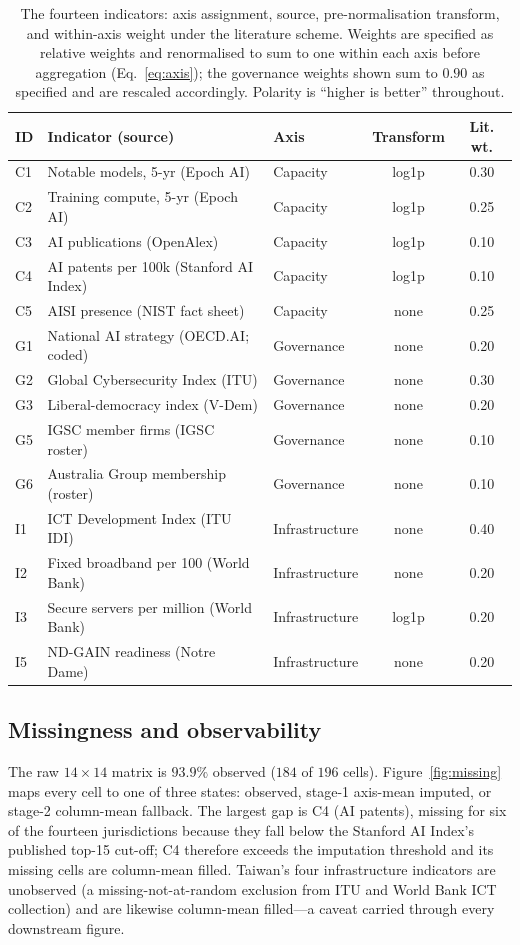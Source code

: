 \documentclass[11pt]{article}
\begin{document}
\begin{table}[t]
\centering
\caption{The fourteen indicators: axis assignment, source, pre-normalisation transform, and within-axis weight under the literature scheme. Weights are specified as relative weights and renormalised to sum to one within each axis before aggregation (Eq.~\ref{eq:axis}); the governance weights shown sum to $0.90$ as specified and are rescaled accordingly. Polarity is ``higher is better'' throughout.}
\label{tab:indicators}
\footnotesize
\begin{tabularx}{\textwidth}{@{}l Y l c c@{}}
\toprule
\textbf{ID} & \textbf{Indicator (source)} & \textbf{Axis} & \textbf{Transform} & \textbf{Lit. wt.} \\
\midrule
C1 & Notable models, 5-yr (Epoch AI) & Capacity & log1p & 0.30 \\
C2 & Training compute, 5-yr (Epoch AI) & Capacity & log1p & 0.25 \\
C3 & AI publications (OpenAlex) & Capacity & log1p & 0.10 \\
C4 & AI patents per 100k (Stanford AI Index) & Capacity & log1p & 0.10 \\
C5 & AISI presence (NIST fact sheet) & Capacity & none & 0.25 \\
\midrule
G1 & National AI strategy (OECD.AI; coded) & Governance & none & 0.20 \\
G2 & Global Cybersecurity Index (ITU) & Governance & none & 0.30 \\
G3 & Liberal-democracy index (V-Dem) & Governance & none & 0.20 \\
G5 & IGSC member firms (IGSC roster) & Governance & none & 0.10 \\
G6 & Australia Group membership (roster) & Governance & none & 0.10 \\
\midrule
I1 & ICT Development Index (ITU IDI) & Infrastructure & none & 0.40 \\
I2 & Fixed broadband per 100 (World Bank) & Infrastructure & none & 0.20 \\
I3 & Secure servers per million (World Bank) & Infrastructure & log1p & 0.20 \\
I5 & ND-GAIN readiness (Notre Dame) & Infrastructure & none & 0.20 \\
\bottomrule
\end{tabularx}
\end{table}

\subsection{Missingness and observability}
The raw $14\times14$ matrix is $93.9\%$ observed ($184$ of $196$ cells). Figure~\ref{fig:missing} maps every cell to one of three states: observed, stage-1 axis-mean imputed, or stage-2 column-mean fallback. The largest gap is C4 (AI patents), missing for six of the fourteen jurisdictions because they fall below the Stanford AI Index's published top-15 cut-off; C4 therefore exceeds the imputation threshold and its missing cells are column-mean filled. Taiwan's four infrastructure indicators are unobserved (a missing-not-at-random exclusion from ITU and World Bank ICT collection) and are likewise column-mean filled---a caveat carried through every downstream figure.
\end{document}
